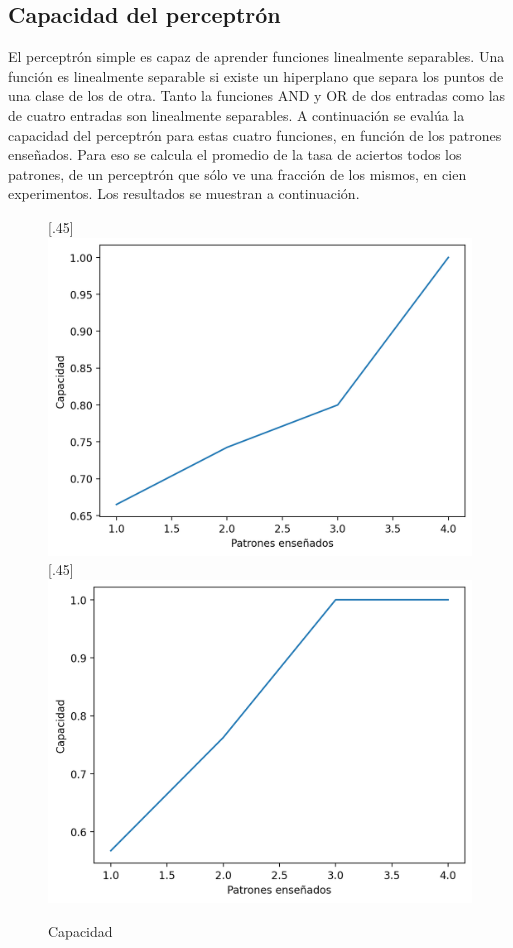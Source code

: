 \documentclass[12pt,a4paper]{article}
\begin{document}
\subsection{Capacidad del perceptrón}
El perceptrón simple es capaz de aprender funciones linealmente separables. Una función es linealmente separable si existe un hiperplano que separa los puntos de una clase de los de otra. Tanto la funciones AND y OR de dos entradas como las de cuatro entradas son linealmente separables. A continuación se evalúa la capacidad del perceptrón para estas cuatro funciones, en función de los patrones enseñados. Para eso se calcula el promedio de la tasa de aciertos todos los patrones, de un perceptrón que sólo ve una fracción de los mismos, en cien experimentos. Los resultados se muestran a continuación.
\begin{figure}[H]
  [.45\linewidth]{
    \includegraphics[width=\linewidth]{img/7-capacity.png}
  }
  [.45\linewidth]{
    \includegraphics[width=\linewidth]{img/8-capacity.png}
  }
  \caption*{Capacidad}
  \centering
\end{figure}
\end{document}

